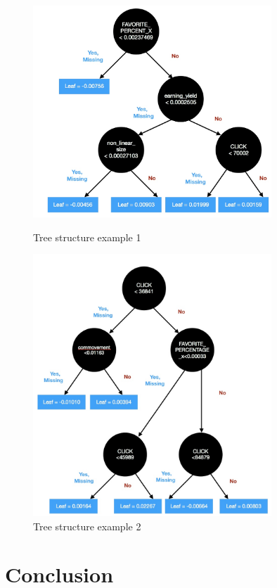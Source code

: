 \documentclass[letterpaper]{article}
\begin{document}
\begin{figure}[htbp]
  \begin{minipage}[t]{0.5\linewidth}
  \centering
  \includegraphics[width=0.8\textwidth]{968-0.jpeg}
  \caption{Tree structure example 1}
  \end{minipage}
  \begin{minipage}[t]{0.5\linewidth}
  \centering
  \includegraphics[width=0.8\textwidth]{968-5.jpeg}
  \caption{Tree structure example 2}
  \end{minipage}
\end{figure}

\section{Conclusion}
\label{conclusion}
\end{document}
